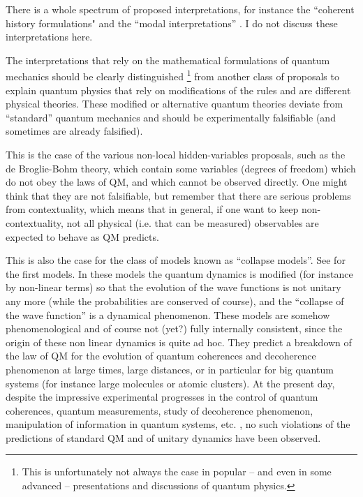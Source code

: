  There is a whole spectrum of  proposed interpretations, for instance the ``coherent history formulations" and the ``modal interpretations'' . I do not  discuss these interpretations here.
 
 The interpretations that rely on the mathematical formulations of quantum mechanics should be clearly distinguished
 \footnote{This is unfortunately not always the case in popular -- and even in some advanced -- presentations and discussions of quantum physics.}
  from another class of  proposals to explain quantum physics that rely on modifications of the rules and are different physical theories. 
These modified or alternative quantum theories  deviate from ``standard'' quantum mechanics and should be experimentally falsifiable (and sometimes are already falsified).

This is the case of the various non-local hidden-variables proposals, such as the de Broglie-Bohm theory, which contain some variables (degrees of freedom) which do not obey the laws of QM, and which cannot be observed directly. One might think that they are not falsifiable, but remember that there are serious problems from contextuality, which means that in general, if one want to keep non-contextuality, not all physical (i.e. that can be measured) observables are expected to behave as QM predicts.


This is also the case for the class of models known as ``collapse models''. 
See \cite{GhRiWe1985,GhRiWe1986} for the first models.
In these models the quantum dynamics is modified (for instance by non-linear terms) so that the evolution of the wave functions is not unitary any more (while the probabilities are conserved of course), and the ``collapse of the wave function'' is a dynamical phenomenon. 
 These models are somehow phenomenological and of course not (yet?) fully  internally consistent, since the origin of these non linear dynamics is quite ad hoc. 
 They predict a breakdown of the law of QM for the evolution of quantum coherences and decoherence phenomenon at large times, large distances, or in particular for big quantum systems (for instance large molecules or atomic clusters).  
At the present day, despite the impressive experimental progresses in the control of quantum coherences, quantum measurements, study of decoherence phenomenon, manipulation of information in quantum systems, etc. , no such violations of the predictions of standard QM and of unitary dynamics have been observed.
 
